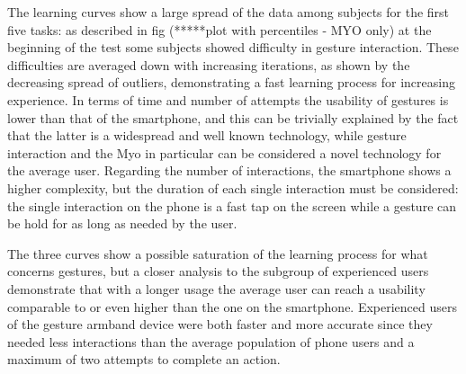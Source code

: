 \documentclass[journal]{./IEEEtran}
\begin{document}
The learning curves show a large spread of the data among subjects for the first five tasks: as described in fig (*****plot with percentiles - MYO only) at the beginning of the test some subjects showed difficulty in gesture interaction. These difficulties are averaged down with increasing iterations, as shown by the decreasing spread of outliers, demonstrating a fast learning process for increasing experience. 
In terms of time and number of attempts the usability of gestures is lower than that of the smartphone, and this can be trivially explained by the fact that the latter is a widespread and well known technology, while gesture interaction and the Myo in particular can be considered a novel technology for the average user. Regarding the number of interactions, the smartphone shows a higher complexity, but the duration of each single interaction must be considered: the single interaction on the phone is a fast tap on the screen while a gesture can be hold for as long as needed by the user.

The three curves show a possible saturation of the learning process for what concerns gestures, but a closer analysis to the subgroup of experienced users demonstrate that with a longer usage the average user can reach a usability comparable to or even higher than the one on the smartphone. 
Experienced users of the gesture armband device were both faster and more accurate since they needed less interactions than the average population of phone users and a maximum of two attempts to complete an action.





%
%
\end{document}
